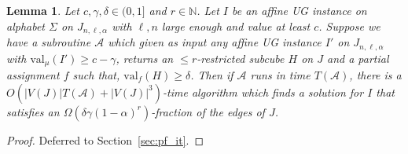 \documentclass[11pt]{article}
\def \cA {\mathcal{A}}
\def \nn {\mathbb{N}}
\def \val {\mathrm{val}}
\newtheorem{lemma}[theorem]{Lemma}
\theoremstyle{definition}
\begin{document}
\begin{lemma}\label{lem:subroutine}
Let $c,\gamma,\delta \in (0,1]$ and $r \in \nn$. Let $I$ be an affine UG instance on alphabet $\Sigma$ on $J_{n,\ell,\alpha}$ with $\ell, n$ large enough  and value at least $c$. 
Suppose we have a subroutine $\cA$ which given as input any affine UG instance $I'$ on $J_{n,\ell,\alpha}$ with $\val_\mu(I') \ge c-\gamma$, returns an $\leq r$-restricted subcube $H$ on $J$ and a partial assignment $f$ such that, $\text{val}_{f}(H) \geq \delta$.
Then if $\cA$ runs in time $T(\cA)$, there is a $O(|V(J)|T(\cA)+|V(J)|^3)$-time algorithm which finds a solution for $I$ that satisfies an $\Omega(\delta\gamma(1-\alpha)^r)$-fraction of the  edges of $J$. 
\end{lemma}
\begin{proof}
Deferred to Section~\ref{sec:pf_it}.
\end{proof}



\end{document}
